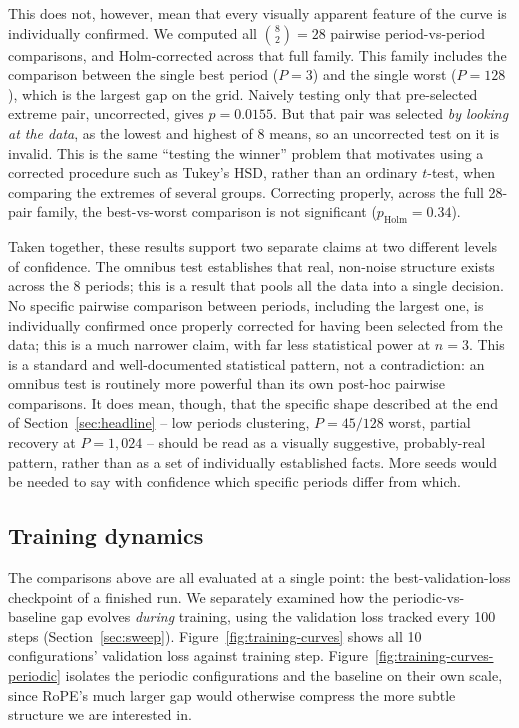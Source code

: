 \documentclass[11pt]{article}
\begin{document}
This does not, however, mean that every visually apparent feature of the curve is individually confirmed. We computed all $\binom{8}{2}=28$ pairwise period-vs-period comparisons, and Holm-corrected across that full family. This family includes the comparison between the single best period ($P=3$) and the single worst ($P=128$), which is the largest gap on the grid. Naively testing only that pre-selected extreme pair, uncorrected, gives $p=0.0155$. But that pair was selected \emph{by looking at the data}, as the lowest and highest of 8 means, so an uncorrected test on it is invalid. This is the same ``testing the winner'' problem that motivates using a corrected procedure such as Tukey's HSD, rather than an ordinary $t$-test, when comparing the extremes of several groups. Correcting properly, across the full 28-pair family, the best-vs-worst comparison is not significant ($p_{\text{Holm}}=0.34$).

Taken together, these results support two separate claims at two different levels of confidence. The omnibus test establishes that real, non-noise structure exists across the 8 periods; this is a result that pools all the data into a single decision. No specific pairwise comparison between periods, including the largest one, is individually confirmed once properly corrected for having been selected from the data; this is a much narrower claim, with far less statistical power at $n=3$. This is a standard and well-documented statistical pattern, not a contradiction: an omnibus test is routinely more powerful than its own post-hoc pairwise comparisons. It does mean, though, that the specific shape described at the end of Section~\ref{sec:headline} -- low periods clustering, $P=45/128$ worst, partial recovery at $P=1{,}024$ -- should be read as a visually suggestive, probably-real pattern, rather than as a set of individually established facts. More seeds would be needed to say with confidence which specific periods differ from which.

\subsection{Training dynamics}
\label{sec:training-dynamics}

The comparisons above are all evaluated at a single point: the best-validation-loss checkpoint of a finished run. We separately examined how the periodic-vs-baseline gap evolves \emph{during} training, using the validation loss tracked every 100 steps (Section~\ref{sec:sweep}). Figure~\ref{fig:training-curves} shows all 10 configurations' validation loss against training step. Figure~\ref{fig:training-curves-periodic} isolates the periodic configurations and the baseline on their own scale, since RoPE's much larger gap would otherwise compress the more subtle structure we are interested in.
\end{document}

